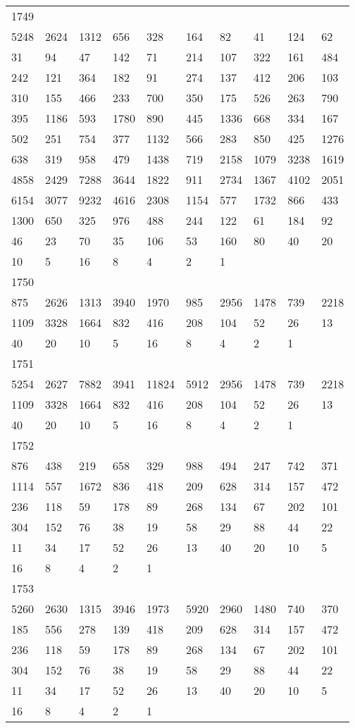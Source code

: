 \begin{longtable}{*{10}{l}}
1749&&&&&&&&&\\
5248& 2624& 1312& 656& 328& 164& 82& 41& 124& 62\\
31& 94& 47& 142& 71& 214& 107& 322& 161& 484\\
242& 121& 364& 182& 91& 274& 137& 412& 206& 103\\
310& 155& 466& 233& 700& 350& 175& 526& 263& 790\\
395& 1186& 593& 1780& 890& 445& 1336& 668& 334& 167\\
502& 251& 754& 377& 1132& 566& 283& 850& 425& 1276\\
638& 319& 958& 479& 1438& 719& 2158& 1079& 3238& 1619\\
4858& 2429& 7288& 3644& 1822& 911& 2734& 1367& 4102& 2051\\
6154& 3077& 9232& 4616& 2308& 1154& 577& 1732& 866& 433\\
1300& 650& 325& 976& 488& 244& 122& 61& 184& 92\\
46& 23& 70& 35& 106& 53& 160& 80& 40& 20\\
10& 5& 16& 8& 4& 2& 1& \\

1750&&&&&&&&&\\
875& 2626& 1313& 3940& 1970& 985& 2956& 1478& 739& 2218\\
1109& 3328& 1664& 832& 416& 208& 104& 52& 26& 13\\
40& 20& 10& 5& 16& 8& 4& 2& 1& \\

1751&&&&&&&&&\\
5254& 2627& 7882& 3941& 11824& 5912& 2956& 1478& 739& 2218\\
1109& 3328& 1664& 832& 416& 208& 104& 52& 26& 13\\
40& 20& 10& 5& 16& 8& 4& 2& 1& \\

1752&&&&&&&&&\\
876& 438& 219& 658& 329& 988& 494& 247& 742& 371\\
1114& 557& 1672& 836& 418& 209& 628& 314& 157& 472\\
236& 118& 59& 178& 89& 268& 134& 67& 202& 101\\
304& 152& 76& 38& 19& 58& 29& 88& 44& 22\\
11& 34& 17& 52& 26& 13& 40& 20& 10& 5\\
16& 8& 4& 2& 1& \\

1753&&&&&&&&&\\
5260& 2630& 1315& 3946& 1973& 5920& 2960& 1480& 740& 370\\
185& 556& 278& 139& 418& 209& 628& 314& 157& 472\\
236& 118& 59& 178& 89& 268& 134& 67& 202& 101\\
304& 152& 76& 38& 19& 58& 29& 88& 44& 22\\
11& 34& 17& 52& 26& 13& 40& 20& 10& 5\\
16& 8& 4& 2& 1& \\


\end{longtable}

